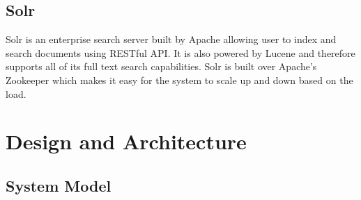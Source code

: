 \documentclass[a4paper,11pt]{kth-mag}
\begin{document}
\section{Solr}

Solr \cite{solr} is an enterprise search server built by Apache allowing user to index and search documents using RESTful API. It is also powered by Lucene and therefore supports all of its full text search capabilities. Solr is built over Apache's Zookeeper which makes it easy for the system to scale up and down based on the load.






\chapter{Design and Architecture}
\label{chap:design}

\section{System Model}
\end{document}
